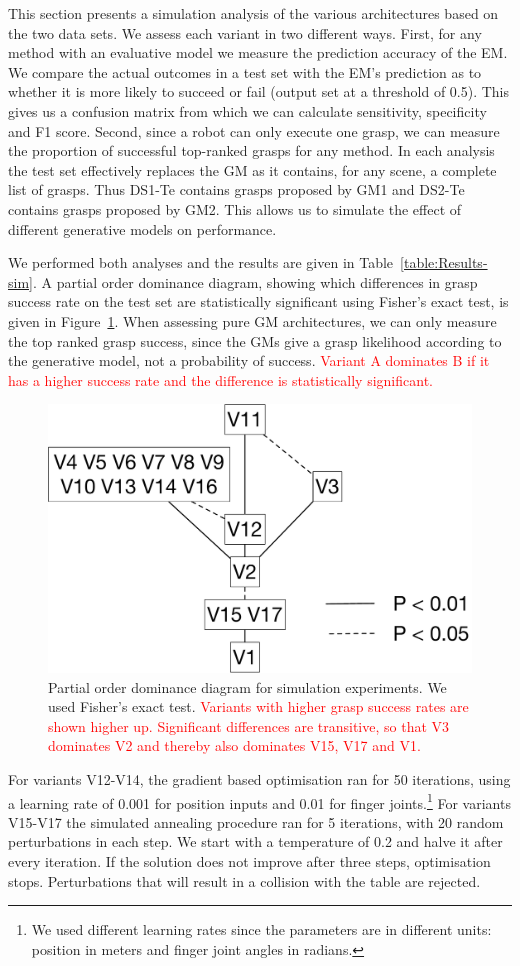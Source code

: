 This section presents a simulation analysis of the various architectures based on the two data sets. 
We assess each variant in two different ways. First, for any method with an evaluative model we  measure the prediction accuracy of the EM. We compare the actual outcomes in a test set with the EM's prediction as to whether it is more likely to succeed or fail (output set at a threshold of 0.5). This gives us a confusion matrix from which we can calculate sensitivity, specificity and F1 score. Second, since a robot can only execute one grasp, we can measure the proportion of successful top-ranked grasps for any method. In each analysis the test set effectively replaces the GM as it contains, for any scene, a complete list of grasps. Thus DS1-Te contains grasps proposed by GM1 and DS2-Te contains grasps proposed by GM2. This allows us to simulate the effect of different generative models on performance.

We performed both analyses and the results are given in Table~\ref{table:Results-sim}. A partial order dominance diagram, showing which differences in grasp success rate on the test set are statistically significant using Fisher's exact test, is given in Figure~\ref{fig:dominance}. When assessing pure GM architectures, we can only measure the top ranked grasp success, since the GMs give a grasp likelihood according to the generative model, not a probability of success. \textcolor{red}{Variant A dominates B if it has a higher success rate and the difference is statistically significant.}

\begin{figure}
\centering
\includegraphics[width=0.5\columnwidth]{images/dominance}
\caption{Partial order dominance diagram for simulation experiments. We used Fisher's exact test. \textcolor{red}{Variants with higher grasp success rates are shown higher up. Significant differences are transitive, so that V3 dominates V2 and thereby also dominates V15, V17 and V1.}}
\label{fig:dominance}
\end{figure}

For variants V12-V14, the gradient based optimisation ran for 50 iterations, using a learning rate of 0.001 for position inputs and 0.01 for finger joints.\footnote{We used different learning rates since the parameters are in different units: position in meters and finger joint angles in radians.} For variants V15-V17 the simulated annealing procedure ran for 5 iterations, with 20 random perturbations in each step. We start with a temperature of 0.2 and halve it after every iteration. If the solution does not improve after three steps, optimisation stops. Perturbations that will result in a collision with the table are rejected.

